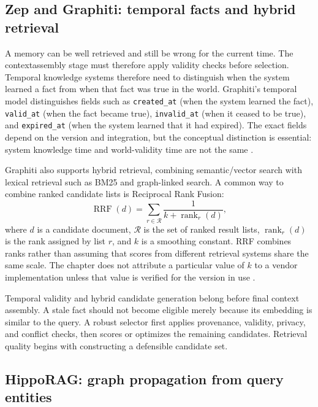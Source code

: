 \subsection{Zep and Graphiti: temporal facts and hybrid retrieval}
\label{subsec:ch12-zep-graphiti}

A memory can be well retrieved and still be wrong for the current time. The \gls{contextassembly} stage must therefore apply validity checks before selection. Temporal knowledge systems therefore need to distinguish when the system learned a fact from when that fact was true in the world. Graphiti's temporal model distinguishes fields such as \texttt{created\_at} (when the system learned the fact), \texttt{valid\_at} (when the fact became true), \texttt{invalid\_at} (when it ceased to be true), and \texttt{expired\_at} (when the system learned that it had expired). The exact fields depend on the version and integration, but the conceptual distinction is essential: system knowledge time and world-validity time are not the same \autocite{zepgraphitidocs}.

Graphiti also supports hybrid retrieval, combining semantic/vector search with lexical retrieval such as BM25 and graph-linked search. A common way to combine ranked candidate lists is Reciprocal Rank Fusion:
\begin{equation}
  \operatorname{RRF}(d)=\sum_{r\in\mathcal{R}}\frac{1}{k+\operatorname{rank}_r(d)},
  \label{eq:ch12-rrf}
\end{equation}
where \(d\) is a candidate document, \(\mathcal{R}\) is the set of ranked result lists, \(\operatorname{rank}_r(d)\) is the rank assigned by list \(r\), and \(k\) is a smoothing constant. RRF combines ranks rather than assuming that scores from different retrieval systems share the same scale. The chapter does not attribute a particular value of \(k\) to a vendor implementation unless that value is verified for the version in use \autocite{cormack2009rrf,zepgraphitidocs}.

Temporal validity and hybrid candidate generation belong before final context assembly. A stale fact should not become eligible merely because its embedding is similar to the query. A robust selector first applies provenance, validity, privacy, and conflict checks, then scores or optimizes the remaining candidates. Retrieval quality begins with constructing a defensible candidate set.

\subsection{HippoRAG: graph propagation from query entities}
\label{subsec:ch12-hipporag}

